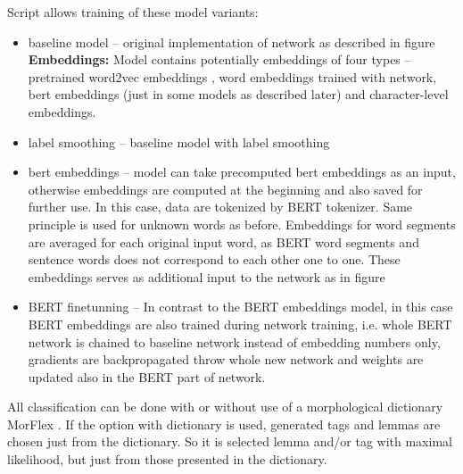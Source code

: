 Script allows training of these model variants:
\begin{itemize}
\item baseline model -- original implementation %
of network as described in figure %
\\ \textbf{Embeddings:} %
Model contains potentially embeddings of four types -- pretrained word2vec embeddings %
, word embeddings trained with network, bert embeddings (just in some models as described later) and character-level embeddings.
\item label smoothing -- baseline model with label smoothing %
\item bert embeddings -- model can take precomputed bert embeddings as an input, otherwise embeddings are computed at the beginning and also saved for further use. In this case, data are tokenized by BERT tokenizer. Same principle is used for unknown words as before. Embeddings for word segments are averaged for each original input word, as BERT word segments and sentence words does not correspond to each other one to one. These embeddings serves as additional input to the network as in figure %
\item BERT finetunning -- In contrast to the BERT embeddings model, in this case BERT embeddings are also trained during network training, i.e. whole BERT network is chained to baseline network instead of embedding numbers only, gradients are backpropagated throw whole new network and weights are updated also in the BERT part of network.
\end{itemize}
All classification can be done with or without use of a morphological dictionary MorFlex %
. If the option with dictionary is used, generated tags and lemmas are chosen just from the dictionary. So it is selected lemma and/or tag with maximal likelihood, but just from those presented in the dictionary.


